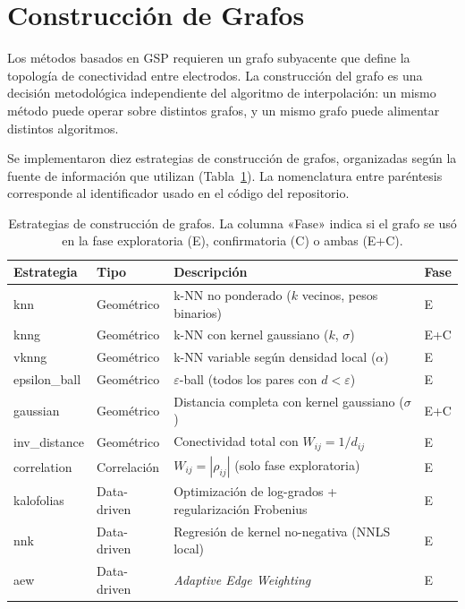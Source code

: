 \section{Construcción de Grafos}
\label{sec:graph_construction_methods}

Los métodos basados en GSP requieren un grafo subyacente que define la topología de conectividad entre electrodos. La construcción del grafo es una decisión metodológica independiente del algoritmo de interpolación: un mismo método puede operar sobre distintos grafos, y un mismo grafo puede alimentar distintos algoritmos.

Se implementaron diez estrategias de construcción de grafos, organizadas según la fuente de información que utilizan (Tabla~\ref{tab:graph_methods}). La nomenclatura entre paréntesis corresponde al identificador usado en el código del repositorio.

\begin{table}[htbp]
\centering
\caption{Estrategias de construcción de grafos. La columna «Fase» indica si el grafo se usó en la fase exploratoria (E), confirmatoria (C) o ambas (E+C).}
\label{tab:graph_methods}
\small
\begin{tabular}{@{}llp{4.8cm}l@{}}
\toprule
Estrategia & Tipo & Descripción & Fase \\
\midrule
knn & Geométrico & k-NN no ponderado ($k$ vecinos, pesos binarios) & E \\
knng & Geométrico & k-NN con kernel gaussiano ($k$, $\sigma$) & E+C \\
vknng & Geométrico & k-NN variable según densidad local ($\alpha$) & E \\
epsilon\_ball & Geométrico & $\varepsilon$-ball (todos los pares con $d<\varepsilon$) & E \\
gaussian & Geométrico & Distancia completa con kernel gaussiano ($\sigma$) & E+C \\
inv\_distance & Geométrico & Conectividad total con $W_{ij}=1/d_{ij}$ & E \\
correlation & Correlación & $W_{ij}=|\rho_{ij}|$ (solo fase exploratoria) & E \\
kalofolias & Data-driven & Optimización de log-grados + regularización Frobenius & E \\
nnk & Data-driven & Regresión de kernel no-negativa (NNLS local) & E \\
aew & Data-driven & \textit{Adaptive Edge Weighting} & E \\
\bottomrule
\end{tabular}
\end{table}

